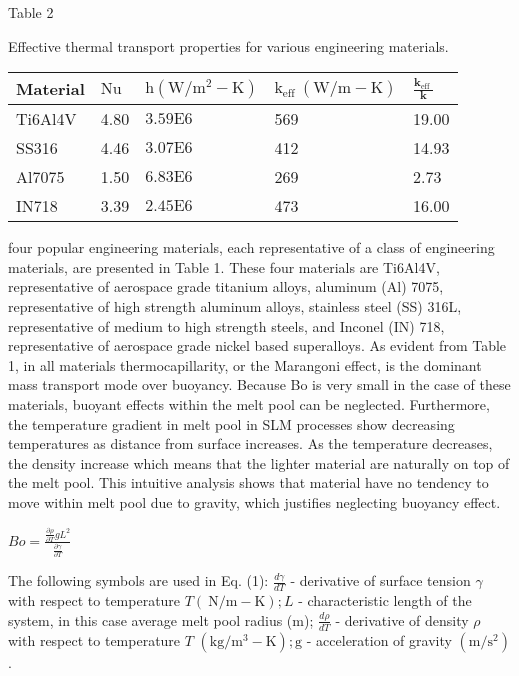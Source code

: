 \documentclass[10pt]{article}
\begin{document}
Table 2

Effective thermal transport properties for various engineering materials.

\begin{center}
\begin{tabular}{lllll}
\hline
Material & $\mathrm{Nu}$ & $\mathrm{h}\left(\mathrm{W} / \mathrm{m}^{2}-\mathrm{K}\right)$ & $\mathrm{k}_{\text {eff }}(\mathrm{W} / \mathrm{m}-\mathrm{K})$ & $\frac{\boldsymbol{k}_{\text {eff }}}{\boldsymbol{k}}$ \\
\hline
Ti6Al4V & 4.80 & $3.59 \mathrm{E} 6$ & 569 & 19.00 \\
SS316 & 4.46 & $3.07 \mathrm{E} 6$ & 412 & 14.93 \\
Al7075 & 1.50 & $6.83 \mathrm{E} 6$ & 269 & 2.73 \\
IN718 & 3.39 & $2.45 \mathrm{E} 6$ & 473 & 16.00 \\
\hline
\end{tabular}
\end{center}

four popular engineering materials, each representative of a class of engineering materials, are presented in Table 1. These four materials are Ti6Al4V, representative of aerospace grade titanium alloys, aluminum (Al) 7075, representative of high strength aluminum alloys, stainless steel (SS) 316L, representative of medium to high strength steels, and Inconel (IN) 718, representative of aerospace grade nickel based superalloys. As evident from Table 1, in all materials thermocapillarity, or the Marangoni effect, is the dominant mass transport mode over buoyancy. Because Bo is very small in the case of these materials, buoyant effects within the melt pool can be neglected. Furthermore, the temperature gradient in melt pool in SLM processes show decreasing temperatures as distance from surface increases. As the temperature decreases, the density increase which means that the lighter material are naturally on top of the melt pool. This intuitive analysis shows that material have no tendency to move within melt pool due to gravity, which justifies neglecting buoyancy effect.

$B o=\frac{\frac{\partial \rho}{\partial T} g L^{2}}{\frac{\partial \gamma}{\partial T}}$

The following symbols are used in Eq. (1): $\frac{d \gamma}{d T}$ - derivative of surface tension $\gamma$ with respect to temperature $T(\mathrm{~N} / \mathrm{m}-\mathrm{K}) ; L$ - characteristic length of the system, in this case average melt pool radius (m); $\frac{d \rho}{d T}$ - derivative of density $\rho$ with respect to temperature $T$ $\left(\mathrm{kg} / \mathrm{m}^{3}-\mathrm{K}\right) ; \mathrm{g}$ - acceleration of gravity $\left(\mathrm{m} / \mathrm{s}^{2}\right)$.
\end{document}
